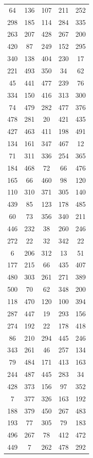 \documentclass[a4paper,12pt]{article}
\begin{document}
\begin{longtable}{|c|c|c|c|c|}
  64 & 136 & 107 & 211 & 252 \\
  298 & 185 & 114 & 284 & 335 \\
  263 & 207 & 428 & 267 & 200 \\
  420 & 87 & 249 & 152 & 295 \\
  340 & 138 & 404 & 230 & 17 \\
  221 & 493 & 350 & 34 & 62 \\
  45 & 441 & 477 & 239 & 76 \\
  334 & 150 & 416 & 313 & 300 \\
  74 & 479 & 282 & 477 & 376 \\
  478 & 281 & 20 & 421 & 435 \\
  427 & 463 & 411 & 198 & 491 \\
  134 & 161 & 347 & 467 & 12 \\
  71 & 311 & 336 & 254 & 365 \\
  184 & 468 & 72 & 66 & 476 \\
  165 & 66 & 460 & 98 & 120 \\
  110 & 310 & 371 & 305 & 140 \\
  439 & 85 & 123 & 178 & 485 \\
  60 & 73 & 356 & 340 & 211 \\
  446 & 232 & 38 & 260 & 246 \\
  272 & 22 & 32 & 342 & 22 \\
  6 & 206 & 312 & 13 & 51 \\
  177 & 215 & 66 & 435 & 407 \\
  480 & 303 & 261 & 271 & 389 \\
  500 & 70 & 62 & 348 & 200 \\
  118 & 470 & 120 & 100 & 394 \\
  287 & 447 & 19 & 293 & 156 \\
  274 & 192 & 22 & 178 & 418 \\
  86 & 210 & 294 & 445 & 246 \\
  343 & 261 & 46 & 257 & 134 \\
  79 & 484 & 171 & 413 & 163 \\
  244 & 487 & 445 & 283 & 34 \\
  428 & 373 & 156 & 97 & 352 \\
  7 & 377 & 326 & 163 & 192 \\
  188 & 379 & 450 & 267 & 483 \\
  193 & 77 & 305 & 79 & 183 \\
  496 & 267 & 78 & 412 & 472 \\
  449 & 7 & 262 & 478 & 292 \\

\end{longtable}
\end{document}
